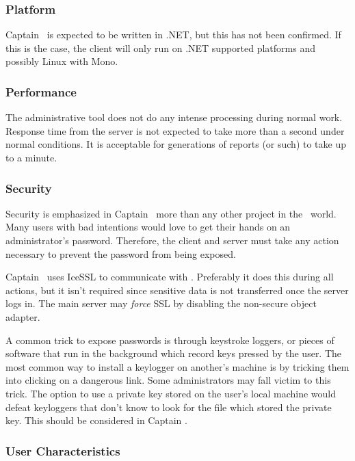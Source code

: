 \subsubsection*{Platform}

Captain \VTank\ is expected to be written in .NET, but this has not been confirmed. If this is the case, the client will only run on .NET supported platforms and possibly Linux with Mono.

\subsubsection*{Performance}

The administrative tool does not do any intense processing during normal work. Response time from the server is not expected to take more than a second under normal conditions. It is acceptable for generations of reports (or such) to take up to a minute.

\subsubsection*{Security}

Security is emphasized in Captain \VTank\ more than any other project in the \VTank\ world. Many users with bad intentions would love to get their hands on an administrator's password. Therefore, the client and server must take any action necessary to prevent the password from being exposed.

Captain \VTank\ uses IceSSL to communicate with \MainServer. Preferably it does this during all actions, but it isn't required since sensitive data is not transferred once the server logs in. The main server may \emph{force} SSL by disabling the non-secure object adapter.

A common trick to expose passwords is through keystroke loggers, or pieces of software that run in the background which record keys pressed by the user. The most common way to install a keylogger on another's machine is by tricking them into clicking on a dangerous link. Some administrators may fall victim to this trick. The option to use a private key stored on the user's local machine would defeat keyloggers that don't know to look for the file which stored the private key. This should be considered in Captain \VTank.

\subsubsection*{User Characteristics}

